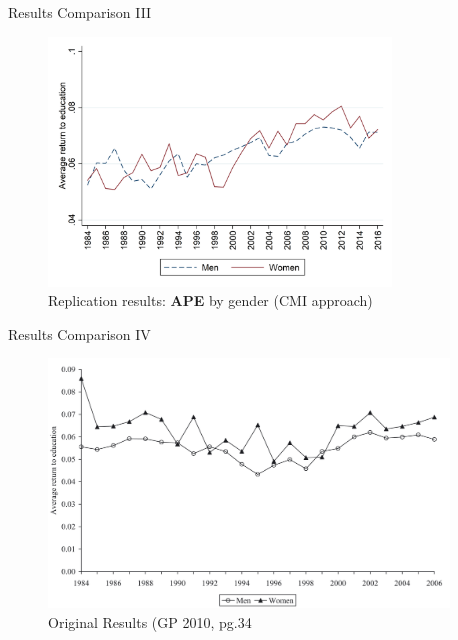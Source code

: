 \documentclass[10pt,ignorenonframetext,]{beamer}
\begin{document}
\begin{frame}{Results Comparison III}
\protect\hypertarget{results-comparison-iii}{}

\begin{figure}
\centering
\includegraphics[width=\textwidth,height=2.60417in]{img/results_sex.png}
\caption{Replication results: \textbf{APE} by gender (CMI approach)}
\end{figure}

\end{frame}

\begin{frame}{Results Comparison IV}
\protect\hypertarget{results-comparison-iv}{}

\begin{figure}
\centering
\includegraphics[width=\textwidth,height=2.60417in]{img/GP2010_CMI_gender.png}
\caption{Original Results (GP 2010, pg.34}
\end{figure}

\end{frame}
\end{document}
